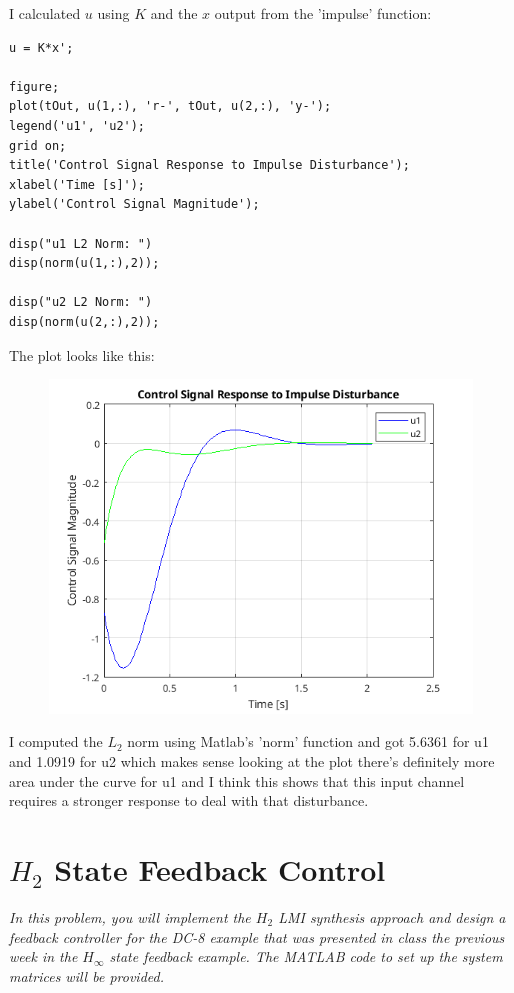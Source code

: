 \documentclass[12pt, letterpaper]{article}
\begin{document}
I calculated $u$ using $K$ and the $x$ output from the 'impulse' function:

\begin{lstlisting}[style=matlabstyle]
u = K*x';

figure;
plot(tOut, u(1,:), 'r-', tOut, u(2,:), 'y-');
legend('u1', 'u2');
grid on;
title('Control Signal Response to Impulse Disturbance');
xlabel('Time [s]');
ylabel('Control Signal Magnitude');

disp("u1 L2 Norm: ")
disp(norm(u(1,:),2));

disp("u2 L2 Norm: ")
disp(norm(u(2,:),2));    
\end{lstlisting}

The plot looks like this:

\begin{figure}[H]
    \centering
    \includegraphics{uResponseHinf.png}
\end{figure}

I computed the $L_2$ norm using Matlab's 'norm' function and got 5.6361 for u1 and 1.0919 for u2 which makes sense looking at the plot there's definitely more area under the curve for u1 and I think this shows that this input channel requires a stronger response to deal with that disturbance.

\section{$H_2$ State Feedback Control}
\textit{
In this problem, you will implement the $H_2$ LMI synthesis approach and design a feedback controller for the DC-8 example that was presented in class the previous week in the $H_\infty$ state feedback example. The MATLAB code to set up the system matrices will be provided.
}
\end{document}
